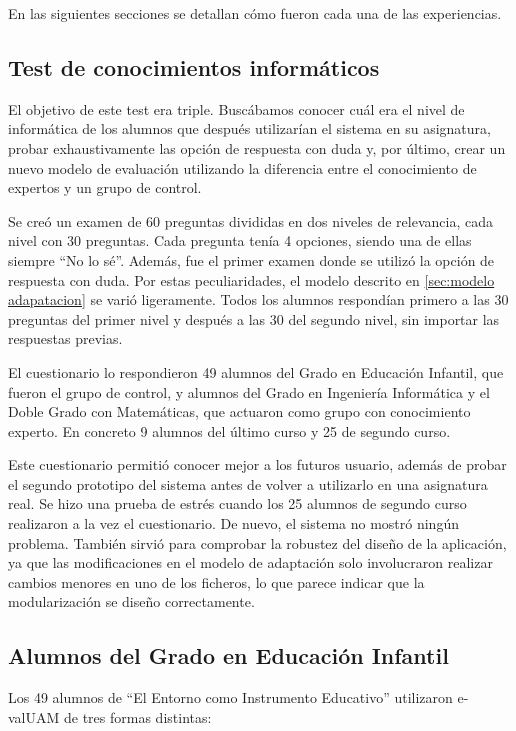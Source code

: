 En las siguientes secciones se detallan cómo fueron cada una de las experiencias.

\subsection{Test de conocimientos informáticos}

El objetivo de este test era triple. Buscábamos conocer cuál era el nivel de informática de los alumnos que después utilizarían el sistema en su asignatura, probar exhaustivamente las opción de respuesta con duda y, por último, crear un nuevo modelo de evaluación utilizando la diferencia entre el conocimiento de expertos y un grupo de control.

Se creó un examen de 60 preguntas divididas en dos niveles de relevancia, cada nivel con 30 preguntas. Cada pregunta tenía 4 opciones, siendo una de ellas siempre ``No lo sé''. Además, fue el primer examen donde se utilizó la opción de respuesta con duda. Por estas peculiaridades, el modelo descrito en \ref{sec:modelo adapatacion} se varió ligeramente. Todos los alumnos respondían primero a las 30 preguntas del primer nivel y después a las 30 del segundo nivel, sin importar las respuestas previas.

El cuestionario lo respondieron 49 alumnos del Grado en Educación Infantil, que fueron el grupo de control, y alumnos del Grado en Ingeniería Informática y el Doble Grado con Matemáticas, que actuaron como grupo con conocimiento experto. En concreto 9 alumnos del último curso y 25 de segundo curso.

Este cuestionario permitió conocer mejor a los futuros usuario, además de probar el segundo prototipo del sistema antes de volver a utilizarlo en una asignatura real. Se hizo una prueba de estrés cuando los 25 alumnos de segundo curso realizaron a la vez el cuestionario. De nuevo, el sistema no mostró ningún problema. También sirvió para comprobar la robustez del diseño de la aplicación, ya que las modificaciones en el modelo de adaptación solo involucraron realizar cambios menores en uno de los ficheros, lo que parece indicar que la modularización se diseño correctamente.

\subsection{Alumnos del Grado en Educación Infantil}

Los 49 alumnos de ``El Entorno como Instrumento Educativo'' utilizaron \acrshort{e-valUAM} de tres formas distintas:

